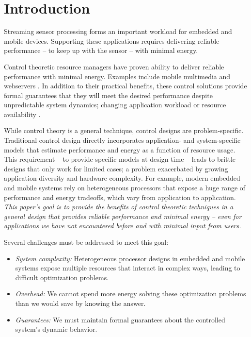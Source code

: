 \section{Introduction}

Streaming sensor processing forms an important workload for embedded
and mobile devices. Supporting these applications requires delivering
reliable performance -- to keep up with the sensor -- with minimal
energy.

Control theoretic resource managers have proven ability to deliver
reliable performance with minimal energy.  Examples include mobile
multimedia \cite{grace,grace2,Agilos,flinn2004,xtune,TCST} and
webservers \cite{Horvarth,Verma,LuEtAl-2006a,sha2002queuefeedback}.
In addition to their practical benefits, these control solutions
provide formal guarantees that they will meet the desired performance
despite unpredictable system dynamics; \eg{} changing application
workload or resource availability
\cite{ICSE2014,Hellerstein2004a,KaramanolisEtAl-2005a}.

While control theory is a general technique, control designs are
problem-specific. Traditional control design directly incorporates
application- and system-specific models that estimate performance and
energy as a function of resource usage.  This requirement -- to
provide specific models at design time -- leads to brittle designs
that only work for limited cases; a problem exacerbated by growing
application diversity and hardware complexity.  For example, modern
embedded and mobile systems rely on heterogeneous processors that
expose a huge range of performance and energy tradeoffs, which vary
from application to application.  \emph{This paper's goal is to
  provide the benefits of control theoretic techniques in a general
  design that provides reliable performance and minimal energy -- even
  for applications we have not encountered before and with minimal
  input from users.}

Several challenges must be addressed to meet this goal:
\begin{itemize}
\item \textit{System complexity:} Heterogeneous processor designs in
  embedded and mobile systems expose multiple resources that interact
  in complex ways, leading to difficult optimization problems.
\item \textit{Overhead:} We cannot spend more energy solving these
  optimization problems than we would save by knowing the answer.
\item \textit{Guarantees:} We must maintain formal guarantees about
  the controlled system's dynamic behavior.
\end{itemize}


